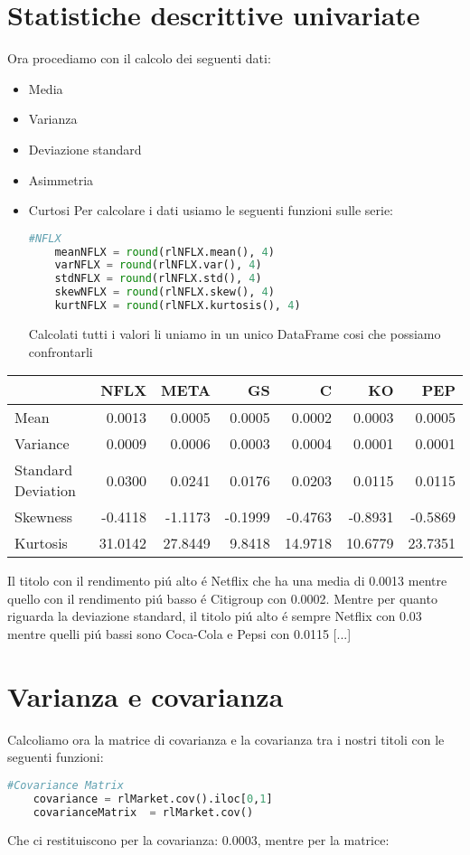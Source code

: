 \documentclass{report}
\begin{document}
\section{Statistiche descrittive univariate}
Ora procediamo con il calcolo dei seguenti dati:
\begin{itemize}[leftmargin=30pt, rightmargin=2cm]
\item Media
\item Varianza
\item Deviazione standard
\item Asimmetria
\item Curtosi
Per calcolare i dati usiamo le seguenti funzioni sulle serie:
\begin{lstlisting}[language=python]
    #NFLX
    meanNFLX = round(rlNFLX.mean(), 4)
    varNFLX = round(rlNFLX.var(), 4)
    stdNFLX = round(rlNFLX.std(), 4)
    skewNFLX = round(rlNFLX.skew(), 4)
    kurtNFLX = round(rlNFLX.kurtosis(), 4)
\end{lstlisting}
Calcolati tutti i valori li uniamo in un unico DataFrame cosi che possiamo confrontarli
\end{itemize}
\begin{tabular}{lrrrrrr}
\toprule
{} &     NFLX &     META &      GS &        C &       KO &      PEP \\
\midrule
Mean               &   0.0013 &   0.0005 &  0.0005 &   0.0002 &   0.0003 &   0.0005 \\
Variance           &   0.0009 &   0.0006 &  0.0003 &   0.0004 &   0.0001 &   0.0001 \\
Standard Deviation &   0.0300 &   0.0241 &  0.0176 &   0.0203 &   0.0115 &   0.0115 \\
Skewness           &  -0.4118 &  -1.1173 & -0.1999 &  -0.4763 &  -0.8931 &  -0.5869 \\
Kurtosis           &  31.0142 &  27.8449 &  9.8418 &  14.9718 &  10.6779 &  23.7351 \\
\bottomrule
\end{tabular}

\noindent Il titolo con il rendimento piú alto é Netflix che ha una media di \num{0.0013} mentre quello con il rendimento piú basso é Citigroup con \num{0.0002}.
Mentre per quanto riguarda la deviazione standard, il titolo piú alto é sempre Netflix con \num{0.03} mentre quelli piú bassi sono Coca-Cola e Pepsi con \num{0.0115} [...]
\section{Varianza e covarianza}
Calcoliamo ora la matrice di covarianza e la covarianza tra i nostri titoli con le seguenti funzioni:
\begin{lstlisting}[language=python]
    #Covariance Matrix
    covariance = rlMarket.cov().iloc[0,1]
    covarianceMatrix  = rlMarket.cov()
\end{lstlisting}
Che ci restituiscono per la covarianza: \num{0.0003}, mentre per la matrice:
\end{document}
